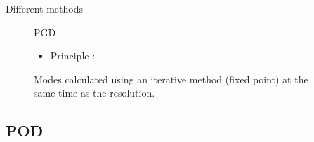 \documentclass[12pt]{beamer}
\begin{document}
\begin{frame}{Different methods}
\begin{figure}
\begin{minipage}{0.47\linewidth}
\begin{exampleblock}{PGD}
{\begin{itemize}
\begin{itemize}
					\end{itemize}
			\end{itemize}
			\begin{itemize}
			\item Principle :
			\end{itemize}
			Modes calculated using an iterative method (fixed point)
			 at the same time as the resolution.	
			\vfill
		}
		\end{exampleblock}
   \end{minipage}
\end{figure}

\end{frame}


\subsection{POD}
\end{document}
